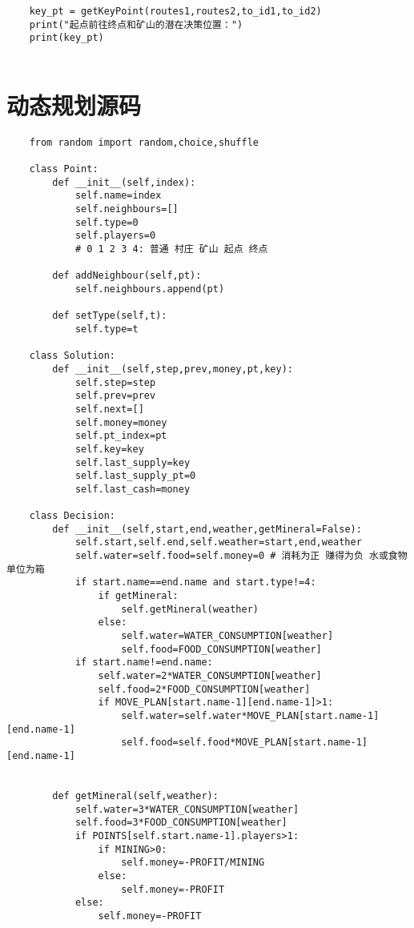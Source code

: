 \documentclass[bwprint]{cumcmthesis} %
\begin{document}
\begin{appendices}
\begin{lstlisting}
    key_pt = getKeyPoint(routes1,routes2,to_id1,to_id2)
    print("起点前往终点和矿山的潜在决策位置：")
    print(key_pt)
    
\end{lstlisting}


\newpage


\section{动态规划源码}
    
\begin{lstlisting}
    from random import random,choice,shuffle

    class Point:
        def __init__(self,index):
            self.name=index
            self.neighbours=[]
            self.type=0
            self.players=0
            # 0 1 2 3 4: 普通 村庄 矿山 起点 终点
    
        def addNeighbour(self,pt):
            self.neighbours.append(pt)
    
        def setType(self,t):
            self.type=t
    
    class Solution:
        def __init__(self,step,prev,money,pt,key):
            self.step=step
            self.prev=prev
            self.next=[]
            self.money=money
            self.pt_index=pt
            self.key=key
            self.last_supply=key
            self.last_supply_pt=0
            self.last_cash=money
    
    class Decision:
        def __init__(self,start,end,weather,getMineral=False):
            self.start,self.end,self.weather=start,end,weather
            self.water=self.food=self.money=0 # 消耗为正 赚得为负 水或食物单位为箱
            if start.name==end.name and start.type!=4:
                if getMineral:
                    self.getMineral(weather)
                else:
                    self.water=WATER_CONSUMPTION[weather]
                    self.food=FOOD_CONSUMPTION[weather]
            if start.name!=end.name:
                self.water=2*WATER_CONSUMPTION[weather]
                self.food=2*FOOD_CONSUMPTION[weather]
                if MOVE_PLAN[start.name-1][end.name-1]>1:
                    self.water=self.water*MOVE_PLAN[start.name-1][end.name-1]
                    self.food=self.food*MOVE_PLAN[start.name-1][end.name-1]
    
    
        def getMineral(self,weather):
            self.water=3*WATER_CONSUMPTION[weather]
            self.food=3*FOOD_CONSUMPTION[weather]
            if POINTS[self.start.name-1].players>1:
                if MINING>0:
                    self.money=-PROFIT/MINING
                else:
                    self.money=-PROFIT
            else:
                self.money=-PROFIT
    

\end{lstlisting}
\end{appendices}
\end{document}
